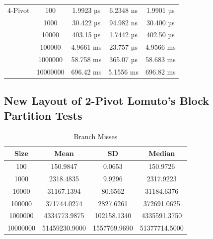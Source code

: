 \documentclass{article}
\begin{document}
\begin{center}
\begin{tabular}{ |c c | c c c| }
        \hline
        4-Pivot         & 100      & 1.9923 µs    &	6.2348 ns   & 1.9901 µs \\
                        & 1000     & 30.422 µs    &	94.982 ns   & 30.400 µs \\
                        & 10000    & 403.15 µs    & 1.7442 µs   & 402.50 µs \\
                        & 100000   & 4.9661 ms    & 23.757 µs   & 4.9566 ms \\
                        & 1000000  & 58.758 ms    & 365.07 µs 	& 58.683 ms \\
                        & 10000000 & 696.42 ms    & 5.1556 ms   & 696.82 ms \\
        \hline
    \end{tabular}
\end{center}

\subsection{New Layout of 2-Pivot Lomuto's Block Partition Tests}

\small
\begin{table}[H]
    \centering
    \small
    \caption{Branch Misses}
    \vspace{1em}
    \begin{tabular}{ | c | c c c| }
        \hline
        Size     & Mean           & SD            & Median \\
        \hline
        100      & 150.9847       & 0.0653        & 150.9726 \\
        1000     & 2318.4835      & 9.9296        & 2317.9223 \\
        10000    & 31167.1394     & 80.6562       & 31184.6376 \\
        100000   & 371744.0274    & 2827.6261     & 372691.0625 \\
        1000000  & 4334773.9875   & 102158.1340   & 4335591.3750 \\
        10000000 & 51459230.9000  & 1557769.9690  & 51377714.5000 \\
        \hline
    \end{tabular}
\end{table}
\end{document}
